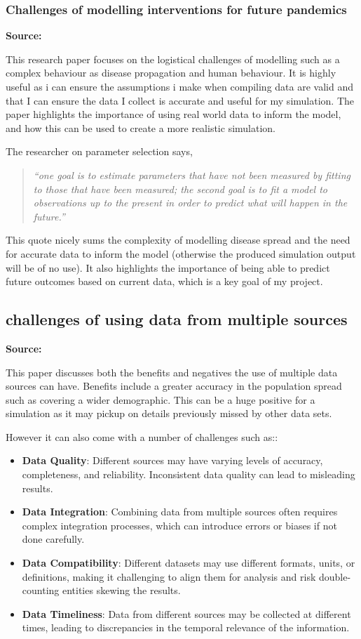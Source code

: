\subsubsection*{Challenges of modelling interventions for future pandemics}
\textbf{Source:} \autocite{kretzschmarChallengesModellingInterventions2022}

This research paper focuses on the logistical challenges of modelling such as a complex behaviour as disease propagation and human behaviour. It is highly useful as i can ensure the assumptions i make when compiling data are valid and that I can ensure the data I collect is accurate and useful for my simulation. The paper highlights the importance of using real world data to inform the model, and how this can be used to create a more realistic simulation. 

The researcher on parameter selection says, 
\begin{quote}
\textit{“one goal is to estimate parameters that have not been measured by fitting to those that have been measured; the second goal is to fit a model to observations up to the present in order to predict what will happen in the future.”}
\end{quote}
This quote nicely sums the complexity of modelling disease spread and the need for accurate data to inform the model (otherwise the produced simulation output will be of no use). It also highlights the importance of being able to predict future outcomes based on current data, which is a key goal of my project.


\subsection{challenges of using data from multiple sources}
\textbf{Source:} \autocite{deangelisFourKeyChallenges2015}

This paper discusses both the benefits and negatives the use of multiple data sources can have. Benefits include a greater accuracy in the population spread such as covering a wider demographic. This can be a huge positive for a simulation as it may pickup on details previously missed by other data sets.

However it can also come with a number of challenges such as::
\begin{itemize}
    \item \textbf{Data Quality}: Different sources may have varying levels of accuracy, completeness, and reliability. Inconsistent data quality can lead to misleading results.
    \item \textbf{Data Integration}: Combining data from multiple sources often requires complex integration processes, which can introduce errors or biases if not done carefully.
    \item \textbf{Data Compatibility}: Different datasets may use different formats, units, or definitions, making it challenging to align them for analysis and risk double-counting entities skewing the results.
    \item \textbf{Data Timeliness}: Data from different sources may be collected at different times, leading to discrepancies in the temporal relevance of the information.
    \end{itemize}


